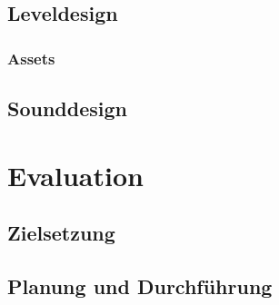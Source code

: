 


\section{Leveldesign}
\subsection{Assets}

\section{Sounddesign}

\chapter{Evaluation}\label{sec:test}
\section{Zielsetzung}
\section{Planung und Durchführung}
